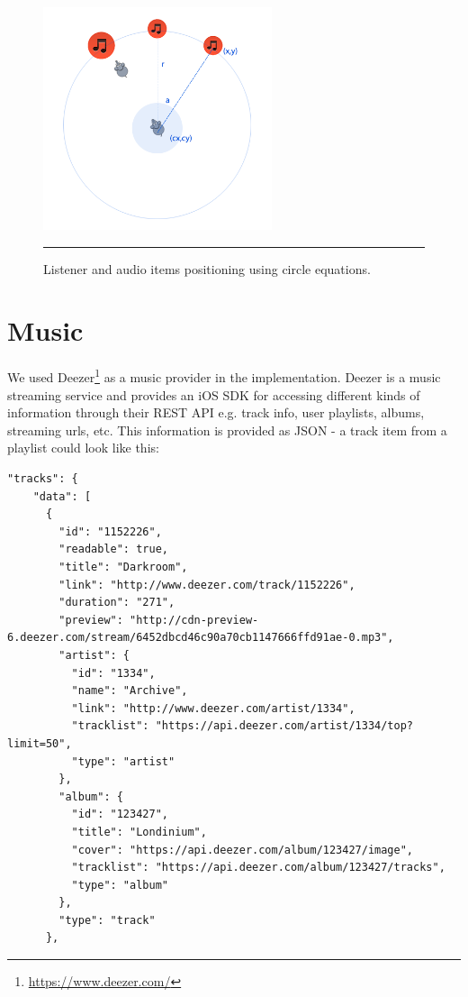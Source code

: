 \begin{figure}[t]
	\centering
		\includegraphics[width=0.6\textwidth,height=\textheight,keepaspectratio]{./Figures/circlepositions.png}
		\rule{35em}{1pt}
	\caption[Audio items positioning]{Listener and audio items positioning using circle equations.}
	\label{fig:circlepositions}
\end{figure}

\section{Music}
We used Deezer\footnote{\url{https://www.deezer.com/}} as a music provider in the implementation. Deezer is a music streaming service and provides an iOS SDK for accessing different kinds of information through their REST API e.g. track info, user playlists, albums, streaming urls, etc. This information is provided as JSON - a track item from a playlist could look like this:

\begin{lstlisting}
"tracks": {
    "data": [
      {
        "id": "1152226",
        "readable": true,
        "title": "Darkroom",
        "link": "http://www.deezer.com/track/1152226",
        "duration": "271",
        "preview": "http://cdn-preview-6.deezer.com/stream/6452dbcd46c90a70cb1147666ffd91ae-0.mp3",
        "artist": {
          "id": "1334",
          "name": "Archive",
          "link": "http://www.deezer.com/artist/1334",
          "tracklist": "https://api.deezer.com/artist/1334/top?limit=50",
          "type": "artist"
        },
        "album": {
          "id": "123427",
          "title": "Londinium",
          "cover": "https://api.deezer.com/album/123427/image",
          "tracklist": "https://api.deezer.com/album/123427/tracks",
          "type": "album"
        },
        "type": "track"
      },
\end{lstlisting}

